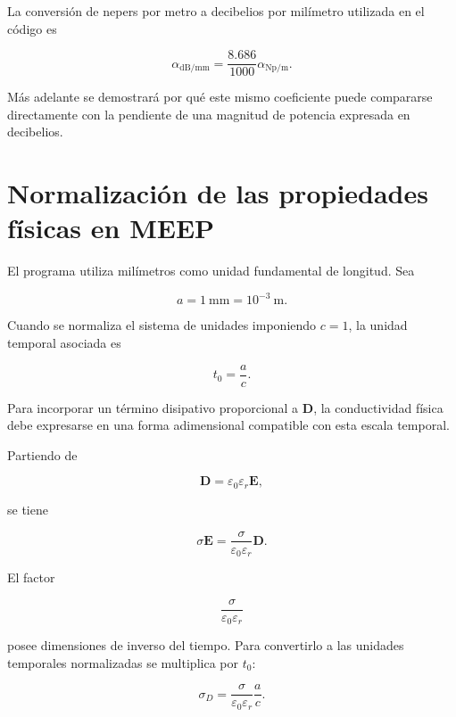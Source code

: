 La conversión de nepers por metro a decibelios por milímetro utilizada en el código es

\begin{equation}
\alpha_{\mathrm{dB/mm}}
=
\frac{8.686}{1000}\alpha_{\mathrm{Np/m}}.
\label{eq:alpha_db}
\end{equation}

Más adelante se demostrará por qué este mismo coeficiente puede compararse directamente con la pendiente de una magnitud de potencia expresada en decibelios.

\section{Normalización de las propiedades físicas en MEEP}

El programa utiliza milímetros como unidad fundamental de longitud. Sea

\begin{equation}
a=1~\mathrm{mm}=10^{-3}~\mathrm{m}.
\end{equation}

Cuando se normaliza el sistema de unidades imponiendo $c=1$, la unidad temporal asociada es

\begin{equation}
t_0=\frac{a}{c}.
\end{equation}

Para incorporar un término disipativo proporcional a $\mathbf{D}$, la conductividad física debe expresarse en una forma adimensional compatible con esta escala temporal.

Partiendo de

\begin{equation}
\mathbf{D}
=
\varepsilon_0\varepsilon_r\mathbf{E},
\end{equation}

se tiene

\begin{equation}
\sigma\mathbf{E}
=
\frac{\sigma}{\varepsilon_0\varepsilon_r}\mathbf{D}.
\end{equation}

El factor

\begin{equation}
\frac{\sigma}{\varepsilon_0\varepsilon_r}
\end{equation}

posee dimensiones de inverso del tiempo. Para convertirlo a las unidades temporales normalizadas se multiplica por $t_0$:

\begin{equation}
\sigma_D
=
\frac{\sigma}{\varepsilon_0\varepsilon_r}
\frac{a}{c}.
\end{equation}

